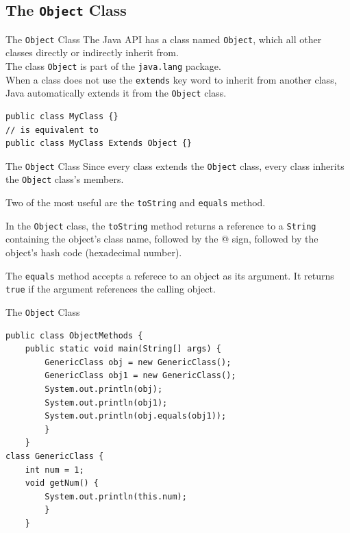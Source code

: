 \documentclass[11pt]{beamer}
\begin{document}
\subsection{The \texttt{Object} Class}
\begin{frame}[fragile]{The \texttt{Object} Class}
    The Java API has a class named \texttt{Object}, which all other classes directly or indirectly inherit from. \\ \vspace{1em}
    The class \texttt{Object} is part of the \texttt{java.lang} package. \\ \vspace{1em}
    When a class does not use the \texttt{extends} key word to inherit from another class, Java automatically extends it from the \texttt{Object} class.
    \begin{lstlisting}
public class MyClass {}
// is equivalent to
public class MyClass Extends Object {}
    \end{lstlisting}
\end{frame}

\begin{frame}{The \texttt{Object} Class}
    Since every class extends the \texttt{Object} class, every class inherits the \texttt{Object} class's members. \\ \vspace{1em}

    Two of the most useful are the \texttt{toString} and \texttt{equals} method. \\ \vspace{1em} 

    In the \texttt{Object} class, the \texttt{toString} method returns a reference to a \texttt{String} containing the object's class name, followed by the @ sign, followed by the object's hash code (hexadecimal number). \\ \vspace{1em}

    The \texttt{equals} method accepts a referece to an object as its argument. It returns \texttt{true} if the argument references the calling object.
\end{frame}

\begin{frame}[fragile]{The \texttt{Object} Class}
    \begin{lstlisting}[basicstyle=\ttfamily\footnotesize]
public class ObjectMethods {
    public static void main(String[] args) {
        GenericClass obj = new GenericClass();
        GenericClass obj1 = new GenericClass();
        System.out.println(obj);
        System.out.println(obj1);
        System.out.println(obj.equals(obj1));
        }
    }
class GenericClass {
    int num = 1;
    void getNum() {
        System.out.println(this.num);
        }
    }
    \end{lstlisting}
\end{frame}
\end{document}
